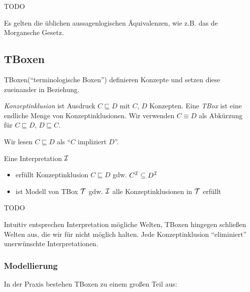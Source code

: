 \begin{tafel}
    TODO
\end{tafel}

Es gelten die üblichen aussagenlogischen Äquivalenzen, wie z.B. das de
Morgansche Gesetz.

\subsection{TBoxen}\label{tboxen}
\label{sec:tbox}

TBoxen(\enquote{terminologische Boxen}) definieren Konzepte und setzen diese zueinander in Beziehung.

\begin{definition}
\emph{Konzeptinklusion} ist Ausdruck $C \sqsubseteq D$ mit $C$, $D$ Konzepten.
Eine \emph{TBox} ist eine endliche Menge von Konzeptinklusionen.  Wir
verwenden $C \equiv D$ als Abkürzung für $C \sqsubseteq D$, $D \sqsubseteq C$.
\end{definition}
Wir lesen $C \sqsubseteq D$ als \enquote{$C$ impliziert $D$}.

\begin{definition} 
Eine Interpretation $\mathcal{I}$
\begin{itemize}
\item
  erfüllt Konzeptinklusion $C \sqsubseteq D$ gdw.
  $C^{\mathcal{I}} \subseteq D^{\mathcal{I}}$
\item
  ist Modell von TBox $\mathcal{T}$ gdw. $\mathcal{I}$ alle Konzeptinklusionen in $\mathcal{T}$
  erfüllt
\end{itemize}
\end{definition}

\begin{tafel}
    TODO
\end{tafel}

Intuitiv entsprechen Interpretation mögliche Welten, TBoxen hingegen schließen Welten aus, die wir für nicht möglich halten. Jede Konzeptinklusion \enquote{eliminiert} unerwünschte Interpretationen.

\subsubsection{Modellierung}\label{modellierung}

In der Praxis bestehen TBoxen zu einem großen Teil aus:

